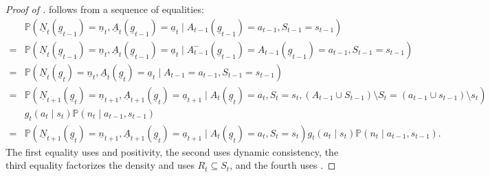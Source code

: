\documentclass[12pt,a4paper]{article}
\theoremstyle{definition}
\newcommand{\PP}[0]{\mathbb{P}}
\begin{document}
\begin{proof}[Proof of
  ]
   follows from a sequence of equalities:
    \begin{align*}
        & \mathbb{P}(\underline{N}_{t}(\underline{g}_{t-1}) = \underline{n}_{t}, \underline{A}_{t}(\underline{g}_{t-1}) = \underline{a}_{t} \mid A_{t-1}(\underline{g}_{t-1}) = a_{t-1}, S_{t-1} = s_{t-1})\\
        =& \mathbb{P}(\underline{N}_{t}(\underline{g}_{t-1}) = \underline{n}_{t}, \underline{A}_{t}(\underline{g}_{t-1}) = \underline{a}_{t} \mid A_{t-1}^{-}(\underline{g}_{t-1}) = A_{t-1}(\underline{g}_{t-1}) = a_{t-1}, S_{t-1} = s_{t-1}) \\
        =& \mathbb{P}(\underline{N}_{t}(\underline{g}_t) = \underline{n}_{t}, \underline{A}_{t}(\underline{g}_t) = \underline{a}_{t} \mid A_{t-1} = a_{t-1}, S_{t-1} = s_{t-1}) \\
        =& \mathbb{P}(\underline{N}_{t+1}(\underline{g}_{t}) = \underline{n}_{t+1}, \underline{A}_{t+1}(\underline{g}_{t}) = \underline{a}_{t+1} \mid A_{t}(\underline{g}_t) = a_t, S_t = s_t, (A_{t-1} \cup S_{t-1}) \setminus S_t = (a_{t-1} \cup s_{t-1}) \setminus s_t)\\
        &g_t(a_t \mid s_t)\PP(n_t \mid a_{t-1}, s_{t-1}) \\
        =& \mathbb{P}(\underline{N}_{t+1}(\underline{g}_t) = \underline{n}_{t+1}, \underline{A}_{t+1}(\underline{g}_t) = \underline{a}_{t+1} \mid A_{t}(\underline{g}_t) = a_t, S_t = s_t) g_t(a_t \mid s_t)\PP(n_t \mid a_{t-1}, s_{t-1}).
    \end{align*}
    The first equality uses
     and positivity,
    the second uses dynamic
    consistency, the third equality factorizes the density %
    and uses $R_t \subseteq S_t$, and the fourth uses
    .

\end{proof}
\end{document}
